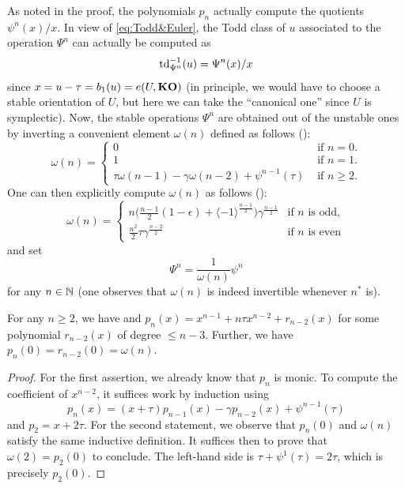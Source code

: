 As noted in the proof, the polynomials $p_n$ actually compute the quotients $\psi^n(x)/x$. In view of \eqref{eq:Todd&Euler}, the Todd class of $u$ associated to the operation $\Psi^n$ can actually be computed as 
\[
\operatorname{td}_{\Psi^n}^{-1}(u)=\Psi^n(x)/x
\]
since $x=u-\tau=b_1(u)=e(U,\mathbf{KO})$ (in principle, we would have to choose a stable orientation of $U$, but here we can take the ``canonical one'' since $U$ is symplectic). Now, the stable operations $\Psi^n$ are obtained out of the unstable ones by inverting a convenient element $\omega(n)$ defined as follows (\cite[Lemma 5.3.3]{FH21}): 
\[
\omega(n)=\begin{cases} 0 & \text{ if $n=0$.}  \\ 1 &  \text{ if $n=1$.} \\ \tau\omega(n-1)-\gamma\omega(n-2)+\psi^{n-1}(\tau) &  \text{ if $n\geq 2$.}\end{cases}
\]
One can then explicitly compute $\omega(n)$ as follows (\cite[Proposition 5.3.4]{FH21}):
\[
\omega(n) = 
\begin{cases}
\displaystyle{n \Big(\frac{n-1}{2} (1-\epsilon) + \langle -1\rangle^{\frac{n-1}{2}}\Big)\gamma^{\frac{n-1}{2}} }& \text{if $n$ is odd},\\
\displaystyle{\frac{n^2}{2}\tau\gamma^{\frac{n-2}{2}}} & \text{if $n$ is even}
\end{cases}
\]
and set 
\begin{equation}\label{eqn:stablevsunstable}
\Psi^n=\frac 1{\omega(n)}\psi^n
\end{equation}
for any $n\in\mathbb{N}$ (one observes that $\omega(n)$ is indeed invertible whenever $n^*$ is).

\begin{lm}
For any $n\geq 2$, we have and $p_n(x)=x^{n-1}+n\tau x^{n-2}+r_{n-2}(x)$ for some polynomial $r_{n-2}(x)$ of degree $\leq n-3$. Further, we have $p_n(0)=r_{n-2}(0)=\omega(n)$.
\end{lm}

\begin{proof}
For the first assertion, we already know that $p_n$ is monic. To compute the coefficient of $x^{n-2}$, it suffices work by induction using  
\[
p_n(x)=(x+\tau)p_{n-1}(x)-\gamma p_{n-2}(x)+\psi^{n-1}(\tau)
\]
and $p_2=x+2\tau$. For the second statement, we observe that $p_n(0)$ and $\omega(n)$ satisfy the same inductive definition. It suffices then to prove that $\omega(2)=p_2(0)$ to conclude. The left-hand side is $\tau+\psi^{1}(\tau)=2\tau$, which is precisely $p_2(0)$.
\end{proof}


